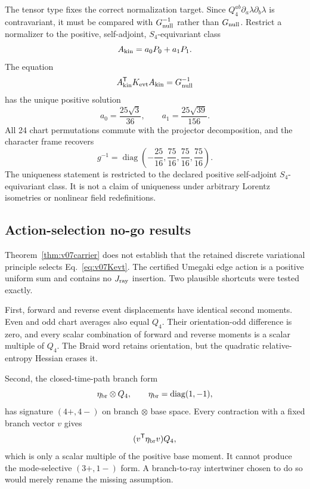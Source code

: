 \documentclass[11pt]{article}
\theoremstyle{definition}
\theoremstyle{remark}
\begin{document}
The tensor type fixes the correct normalization target. Since $Q_4^{ab}\partial_a\lambda\partial_b\lambda$ is contravariant, it must be compared with $G_{\rm null}^{-1}$ rather than $G_{\rm null}$. Restrict a normalizer to the positive, self-adjoint, $S_4$-equivariant class
\begin{equation}
 A_{\rm kin}=a_0P_0+a_1P_1.
\end{equation}
The equation
\begin{equation}\label{eq:v07normalizer}
 A_{\rm kin}^{\mathsf T}K_{\rm evt}A_{\rm kin}=G_{\rm null}^{-1}
\end{equation}
has the unique positive solution
\begin{equation}\label{eq:v07a01}
 a_0=\frac{25\sqrt3}{36},\qquad
 a_1=\frac{25\sqrt{39}}{156}.
\end{equation}
All 24 chart permutations commute with the projector decomposition, and the character frame recovers
\begin{equation}
 g^{-1}=\operatorname{diag}\!\left(
 -\frac{25}{16},\frac{75}{16},\frac{75}{16},\frac{75}{16}
 \right).
\end{equation}
The uniqueness statement is restricted to the declared positive self-adjoint $S_4$-equivariant class. It is not a claim of uniqueness under arbitrary Lorentz isometries or nonlinear field redefinitions.

\subsection{Action-selection no-go results}

Theorem~\ref{thm:v07carrier} does not establish that the retained discrete variational principle selects Eq.~\eqref{eq:v07Kevt}. The certified Umegaki edge action is a positive uniform sum and contains no $J_{\rm ray}$ insertion. Two plausible shortcuts were tested exactly.

First, forward and reverse event displacements have identical second moments. Even and odd chart averages also equal $Q_4$. Their orientation-odd difference is zero, and every scalar combination of forward and reverse moments is a scalar multiple of $Q_4$. The Braid word retains orientation, but the quadratic relative-entropy Hessian erases it.

Second, the closed-time-path branch form
\begin{equation}\label{eq:v07ctp}
 \eta_{\rm br}\otimes Q_4,
 \qquad \eta_{\rm br}=\operatorname{diag}(1,-1),
\end{equation}
has signature $(4+,4-)$ on branch $\otimes$ base space. Every contraction with a fixed branch vector $v$ gives
\begin{equation}
 (v^{\mathsf T}\eta_{\rm br}v)Q_4,
\end{equation}
which is only a scalar multiple of the positive base moment. It cannot produce the mode-selective $(3+,1-)$ form. A branch-to-ray intertwiner chosen to do so would merely rename the missing assumption.
\end{document}

